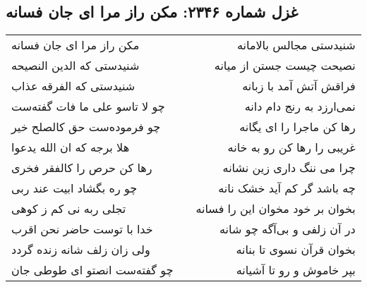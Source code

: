 \begin{center}
\section*{غزل شماره ۲۳۴۶: مکن راز مرا ای جان فسانه}
\label{sec:2346}
\begin{longtable}{l p{0.5cm} r}
مکن راز مرا ای جان فسانه
&&
شنیدستی مجالس بالامانه
\\
شنیدستی که الدین النصیحه
&&
نصیحت چیست جستن از میانه
\\
شنیدستی که الفرقه عذاب
&&
فراقش آتش آمد با زبانه
\\
چو لا تاسو علی ما فات گفته‌ست
&&
نمی‌ارزد به رنج دام دانه
\\
چو فرموده‌ست حق کالصلح خیر
&&
رها کن ماجرا را ای یگانه
\\
هلا برجه که ان الله یدعوا
&&
غریبی را رها کن رو به خانه
\\
رها کن حرص را کالفقر فخری
&&
چرا می ننگ داری زین نشانه
\\
چو ره بگشاد ابیت عند ربی
&&
چه باشد گر کم آید خشک نانه
\\
تجلی ربه نی کم ز کوهی
&&
بخوان بر خود مخوان این را فسانه
\\
خدا با توست حاضر نحن اقرب
&&
در آن زلفی و بی‌آگه چو شانه
\\
ولی زان زلف شانه زنده گردد
&&
بخوان قرآن نسوی تا بنانه
\\
چو گفته‌ست انصتو ای طوطی جان
&&
بپر خاموش و رو تا آشیانه
\\
\end{longtable}
\end{center}
